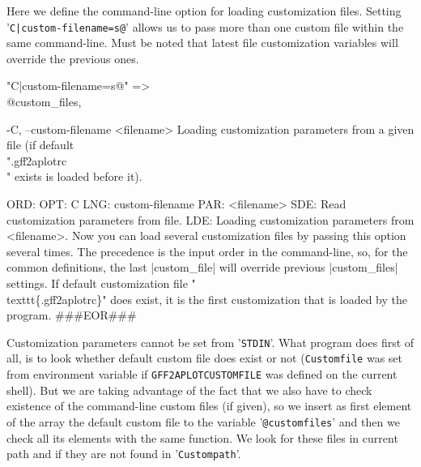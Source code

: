 \documentclass[11pt]{article}
\def\nwendcode{\endtrivlist \endgroup} %
\let\nwdocspar=\par                    %
\begin{document}

Here we define the command-line option for loading customization files. Setting '{\tt{}C|custom-filename=s@}' allows us to pass more than one custom file within the same command-line. Must be noted that latest file customization variables will override the previous ones.

\nwenddocs{}\plusendmoddef
"C|custom-filename=s@"  => \\@custom_files,
\nwendcode{}\nwdocspar
\nwenddocs{}\plusendmoddef
-C, --custom-filename <filename>
      Loading customization parameters from a given file (if 
      default \\".gff2aplotrc\\" exists is loaded before it).
\nwendcode{}\nwdocspar
\nwenddocs{}\plusendmoddef
ORD: 
OPT: C
LNG: custom-filename
PAR: <filename>
SDE: Read customization parameters from file.
LDE:
Loading customization parameters from <filename>. Now you can load 
several customization files by passing this option several times. The 
precedence is the input order in the command-line, so, for the common 
definitions, the last |custom_file| will override previous |custom_files| 
settings. If default customization file "\\texttt\{.gff2aplotrc\}" does exist,
it is the first customization that is loaded by the program.
###EOR###
\nwendcode{}\nwdocspar



Customization parameters cannot be set from '{\tt{}STDIN}'. What program does first of all, is to look whether default custom file does exist or not ({\tt{}{}Custom{}file} was set from environment variable if {\tt{}GFF2APLOT{}CUSTOMFILE} was defined on the current shell). But we are taking advantage of the fact that we also have to check existence of the command-line custom files (if given), so we insert as first element of the array the default custom file to the variable '{\tt{}@custom{}files}' and then we check all its elements with the same function. We look for these files in current path and if they are not found in '{\tt{}{}Custom{}path}'.
\end{document}
